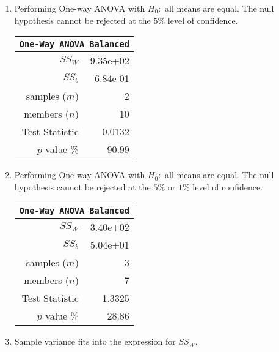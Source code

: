 \begin{enumerate}
\begin{table}[H]
		\bigskip
	\end{table}

	\item Performing One-way ANOVA with $ H_0 : $ all means are equal. The null hypothesis cannot be rejected at the $ 5\% $ level of confidence.
	
	\begin{table}[H]
		\centering
		\begin{tabular}{@{}rr@{}}
			\toprule
			\multicolumn{2}{c}{\texttt{One-Way ANOVA Balanced}} \\
			\midrule
			$SS_W$         &               9.35e+02 \\
			$SS_b$         &               6.84e-01 \\
			samples ($m$)  &                      2 \\
			members ($n$)  &                     10 \\
			Test Statistic &                 0.0132 \\
			$p$ value \%   &                  90.99 \\
			\bottomrule
		\end{tabular}
		\bigskip
	\end{table}

	\item Performing One-way ANOVA with $ H_0 : $ all means are equal. The null hypothesis cannot be rejected at the $ 5\% $ or $ 1\% $ level of confidence.
	
	\begin{table}[H]
		\centering
		\begin{tabular}{@{}rr@{}}
			\toprule
			\multicolumn{2}{c}{\texttt{One-Way ANOVA Balanced}} \\
			\midrule
			$SS_W$         &               3.40e+02 \\
			$SS_b$         &               5.04e+01 \\
			samples ($m$)  &                      3 \\
			members ($n$)  &                      7 \\
			Test Statistic &                 1.3325 \\
			$p$ value \%   &                  28.86 \\
			\bottomrule
		\end{tabular}
		\bigskip
	\end{table}

	\item Sample variance fits into the expression for $ SS_W $,\\
	

\end{enumerate}
